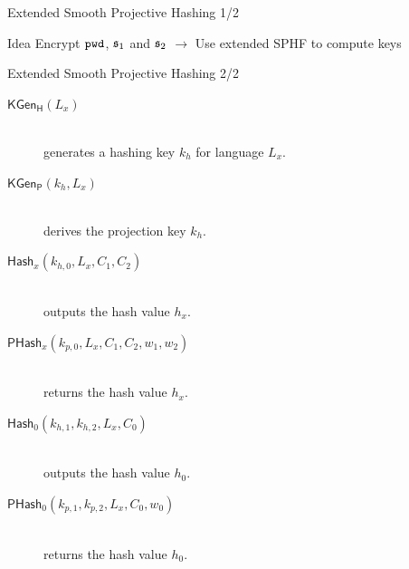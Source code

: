 \documentclass[notes,xcolor=dvipsnames]{beamer}
\begin{document}
\begin{frame}{Extended Smooth Projective Hashing 1/2}


\begin{figure}
\end{figure}

%
%
\begin{beamerboxesrounded}[upper=uppercol,lower=lowercol,shadow=true]{\centering Idea}
	Encrypt $\mathtt{pwd}$, $\mathfrak{s}_1$ and $\mathfrak{s}_2$ $\rightarrow$ Use extended SPHF to compute keys
\end{beamerboxesrounded}

\end{frame}

\begin{frame}{Extended Smooth Projective Hashing 2/2}

\begin{description}
	\item[$\mathsf{KGen_H}(L_x)$]\hfill\\ generates a hashing key $k_h$ for language $L_x$.
	\item[$\mathsf{KGen_P}(k_h,L_x)$]\hfill\\ derives the projection key $k_h$.
	\item[$\mathsf{Hash}_x (k_{h,0},L_x,C_1,C_2)$]\hfill\\ outputs the hash value $h_x$.
	\item[$\mathsf{PHash}_x (k_{p,0},L_x,C_1,C_2,w_1,w_2)$]\hfill\\ returns the hash value $h_x$.
	\item[$\mathsf{Hash}_0(k_{h,1},k_{h,2},L_x,C_0)$]\hfill\\ outputs the hash value $h_0$.
	\item[$\mathsf{PHash}_0(k_{p,1},k_{p,2},L_x,C_0,w_0)$]\hfill\\ returns the hash value $h_0$.
\end{description}

\end{frame}
\end{document}
